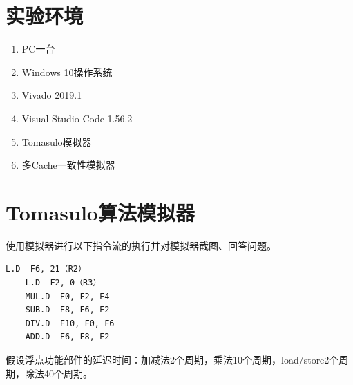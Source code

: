 \documentclass{ctexart}
\begin{document}
\section{\hei 实验环境}
\begin{enumerate}

    \item PC一台
    \item Windows 10操作系统
    \item Vivado 2019.1
    \item Visual Studio Code 1.56.2
    \item Tomasulo模拟器
    \item 多Cache一致性模拟器

\end{enumerate}
\section{\hei Tomasulo算法模拟器}
使用模拟器进行以下指令流的执行并对模拟器截图、回答问题。
\begin{lstlisting}[language={[x86masm]Assembler}]
    L.D  F6, 21（R2）
    L.D  F2, 0（R3）
    MUL.D  F0, F2, F4
    SUB.D  F8, F6, F2
    DIV.D  F10, F0, F6
    ADD.D  F6, F8, F2
    \end{lstlisting}
\par 假设浮点功能部件的延迟时间：加减法2个周期，乘法10个周期，load/store2个周期，除法40个周期。
\end{document}
